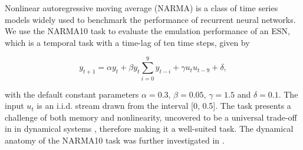 Nonlinear autoregressive moving average (NARMA) \cite{atiya_new_2000} is a class
of time series models widely used to benchmark the performance of recurrent
neural networks. We use the NARMA10 task to evaluate the emulation performance
of an ESN, which is a temporal task with a time-lag of ten time steps, given by


\begin{equation}
  y_{t+1} = \alpha y_{t} +
  \beta y_{t} \sum_{i=0}^{9}y_{t-i} +
  \gamma u_{t}u_{t-9} +
  \delta,
  \label{narma}
\end{equation}

\noindent with the default constant parameters $\alpha = 0.3$, $\beta = 0.05$,
$\gamma = 1.5$ and $\delta = 0.1$. The input $u_{t}$ is an i.i.d. stream drawn
from the interval [0, 0.5]. The task presents a challenge of both memory and
nonlinearity, uncovered to be a universal trade-off in in dynamical systems
\cite{dambre_information_2012, verstraeten_memory_2010}, therefore making it a
well-suited task. The dynamical anatomy of the NARMA10 task was further
investigated in \cite{kubota_dynamical_2019}.






